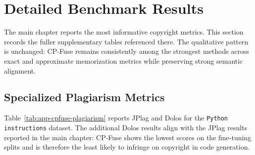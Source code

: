\FloatBarrier
\clearpage

\section{Detailed Benchmark Results}
\label{app:cpfuse-benchmarks}

The main chapter reports the most informative copyright metrics. This section records the fuller supplementary tables referenced there. The qualitative pattern is unchanged: CP-Fuse remains consistently among the strongest methods across exact and approximate memorization metrics while preserving strong semantic alignment.

\subsection{Specialized Plagiarism Metrics}

Table~\ref{tab:app-cpfuse-plagiarism} reports JPlag and Dolos for the \texttt{Python instructions} dataset. The additional Dolos results align with the JPlag results reported in the main chapter: CP-Fuse shows the lowest scores on the fine-tuning splits and is therefore the least likely to infringe on copyright in code generation.

